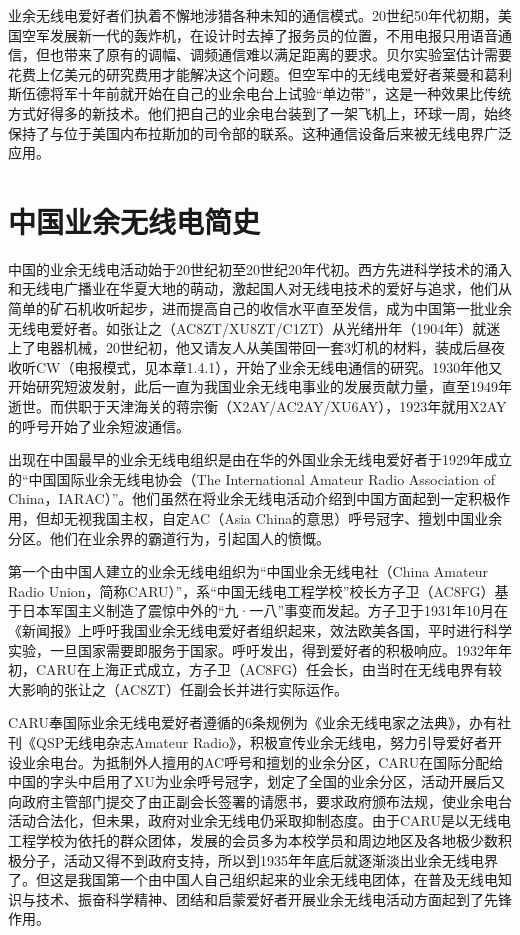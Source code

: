 \documentclass[12pt,UTF8]{ctexbook}
\begin{document}
业余无线电爱好者们执着不懈地涉猎各种未知的通信模式。20世纪50年代初期，美国空军发展新一代的轰炸机，在设计时去掉了报务员的位置，不用电报只用语音通信，但也带来了原有的调幅、调频通信难以满足距离的要求。贝尔实验室估计需要花费上亿美元的研究费用才能解决这个问题。但空军中的无线电爱好者莱曼和葛利斯伍德将军十年前就开始在自己的业余电台上试验“单边带”，这是一种效果比传统方式好得多的新技术。他们把自己的业余电台装到了一架飞机上，环球一周，始终保持了与位于美国内布拉斯加的司令部的联系。这种通信设备后来被无线电界广泛应用。

\section{中国业余无线电简史}

中国的业余无线电活动始于20世纪初至20世纪20年代初。西方先进科学技术的涌入和无线电广播业在华夏大地的萌动，激起国人对无线电技术的爱好与追求，他们从简单的矿石机收听起步，进而提高自己的收信水平直至发信，成为中国第一批业余无线电爱好者。如张让之（AC8ZT/XU8ZT/C1ZT）从光绪卅年（1904年）就迷上了电器机械，20世纪初，他又请友人从美国带回一套3灯机的材料，装成后昼夜收听CW（电报模式，见本章1.4.1），开始了业余无线电通信的研究。1930年他又开始研究短波发射，此后一直为我国业余无线电事业的发展贡献力量，直至1949年逝世。而供职于天津海关的蒋宗衡（X2AY/AC2AY/XU6AY），1923年就用X2AY的呼号开始了业余短波通信。

出现在中国最早的业余无线电组织是由在华的外国业余无线电爱好者于1929年成立的“中国国际业余无线电协会（The International Amateur Radio Association of China，IARAC）”。他们虽然在将业余无线电活动介绍到中国方面起到一定积极作用，但却无视我国主权，自定AC（Asia China的意思）呼号冠字、擅划中国业余分区。他们在业余界的霸道行为，引起国人的愤慨。

第一个由中国人建立的业余无线电组织为“中国业余无线电社（China Amateur Radio Union，简称CARU）”，系“中国无线电工程学校”校长方子卫（AC8FG）基于日本军国主义制造了震惊中外的“九·一八”事变而发起。方子卫于1931年10月在《新闻报》上呼吁我国业余无线电爱好者组织起来，效法欧美各国，平时进行科学实验，一旦国家需要即服务于国家。呼吁发出，得到爱好者的积极响应。1932年年初，CARU在上海正式成立，方子卫（AC8FG）任会长，由当时在无线电界有较大影响的张让之（AC8ZT）任副会长并进行实际运作。

CARU奉国际业余无线电爱好者遵循的6条规例为《业余无线电家之法典》，办有社刊《QSP无线电杂志Amateur Radio》，积极宣传业余无线电，努力引导爱好者开设业余电台。为抵制外人擅用的AC呼号和擅划的业余分区，CARU在国际分配给中国的字头中启用了XU为业余呼号冠字，划定了全国的业余分区，活动开展后又向政府主管部门提交了由正副会长签署的请愿书，要求政府颁布法规，使业余电台活动合法化，但未果，政府对业余无线电仍采取抑制态度。由于CARU是以无线电工程学校为依托的群众团体，发展的会员多为本校学员和周边地区及各地极少数积极分子，活动又得不到政府支持，所以到1935年年底后就逐渐淡出业余无线电界了。但这是我国第一个由中国人自己组织起来的业余无线电团体，在普及无线电知识与技术、振奋科学精神、团结和启蒙爱好者开展业余无线电活动方面起到了先锋作用。
\end{document}
